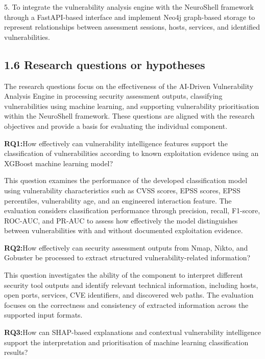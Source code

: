 \documentclass[
]{article}
\begin{document}
5. To integrate the vulnerability analysis engine with the NeuroShell
framework through a FastAPI-based interface and implement Neo4j
graph-based storage to represent relationships between assessment
sessions, hosts, services, and identified vulnerabilities.

\hypertarget{research-questions-or-hypotheses}{%
\subsection{1.6 Research questions or
hypotheses}\label{research-questions-or-hypotheses}}

The research questions focus on the effectiveness of the AI-Driven
Vulnerability Analysis Engine in processing security assessment outputs,
classifying vulnerabilities using machine learning, and supporting
vulnerability prioritisation within the NeuroShell framework. These
questions are aligned with the research objectives and provide a basis
for evaluating the individual component.

\textbf{RQ1:}How effectively can vulnerability intelligence features
support the classification of vulnerabilities according to known
exploitation evidence using an XGBoost machine learning model?

This question examines the performance of the developed classification
model using vulnerability characteristics such as CVSS scores, EPSS
scores, EPSS percentiles, vulnerability age, and an engineered
interaction feature. The evaluation considers classification performance
through precision, recall, F1-score, ROC-AUC, and PR-AUC to assess how
effectively the model distinguishes between vulnerabilities with and
without documented exploitation evidence.

\textbf{RQ2:}How effectively can security assessment outputs from Nmap,
Nikto, and Gobuster be processed to extract structured
vulnerability-related information?

This question investigates the ability of the component to interpret
different security tool outputs and identify relevant technical
information, including hosts, open ports, services, CVE identifiers, and
discovered web paths. The evaluation focuses on the correctness and
consistency of extracted information across the supported input formats.

\textbf{RQ3:}How can SHAP-based explanations and contextual
vulnerability intelligence support the interpretation and prioritisation
of machine learning classification results?
\end{document}
